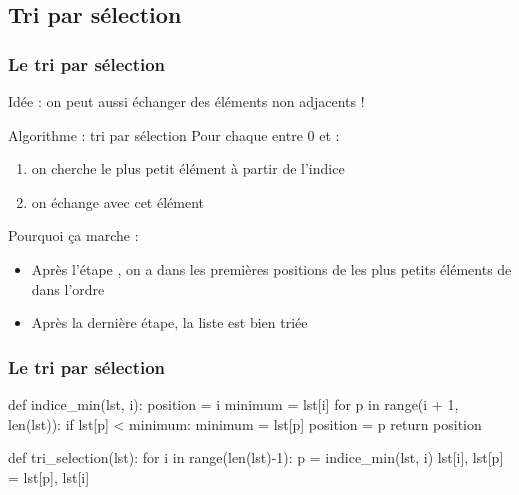 \documentclass[12pt]{linfo-beamer}
\begin{document}
\subsection{Tri par sélection}
\label{sub:tri_par_sélection}

\begin{frame}
  \frametitle{Le tri par sélection}

Idée : on peut aussi échanger des éléments non adjacents !

\vfill

\begin{beamerboxesrounded}{Algorithme : tri par sélection}
Pour chaque  entre 0 et  :
\begin{enumerate}
\item on cherche le plus petit élément à partir de l'indice 
\item on échange  avec cet élément
\end{enumerate}
\end{beamerboxesrounded}

\vfill

Pourquoi ça marche :
\begin{itemize}
\item Après l'étape , on a dans les 
  premières positions de  les  plus petits
  éléments de  dans l'ordre
\item Après la dernière étape, la liste est bien triée
\end{itemize}
\end{frame}



\begin{frame}[fragile]
 \frametitle{Le tri par sélection}

\begin{pyframe}{}
def indice_min(lst, i):
    position = i
    minimum = lst[i]
    for p in range(i + 1, len(lst)):
        if lst[p] < minimum:
            minimum = lst[p]
            position = p
    return position
\end{pyframe}

\begin{pyframe}{}
def tri_selection(lst):
    for i in range(len(lst)-1):
        p = indice_min(lst, i)
        lst[i], lst[p] = lst[p], lst[i]
\end{pyframe}

\end{frame}
\end{document}
